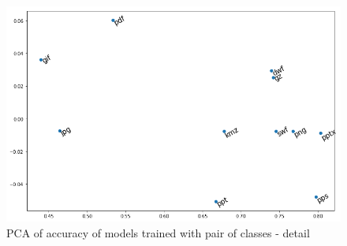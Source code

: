\noindent
\begin{figure}[htb!]
\centering\includegraphics[width=1.0\textwidth]{content/pca2.png}
\caption{\label{fig:pca2}PCA of accuracy of models trained with pair of classes - detail}%
\end{figure}


